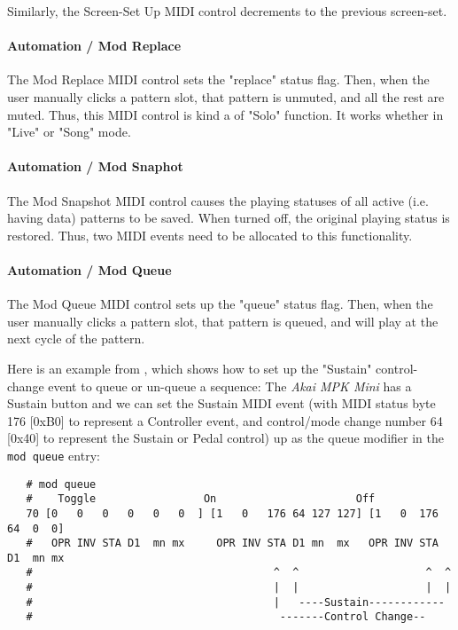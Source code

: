    Similarly, the Screen-Set Up MIDI control decrements to the previous
   screen-set.

\paragraph{Automation / Mod Replace}
\label{paragraph:configuration_midi_ctrl_modrep}

   The Mod Replace MIDI control sets the "replace" status flag.
   Then, when the user manually clicks a pattern slot,
   that pattern is unmuted, and all the rest are muted.
   Thus, this MIDI control is kind a of "Solo" function.
   It works whether in "Live" or "Song" mode.

\paragraph{Automation / Mod Snaphot}
\label{paragraph:configuration_midi_ctrl_modsnap}

   The Mod Snapshot MIDI control causes the playing statuses of all active
   (i.e. having data) patterns to be saved.  When turned off, the
   original playing status is restored.  Thus, two MIDI events
   need to be allocated to this functionality.

\paragraph{Automation / Mod Queue}
\label{paragraph:configuration_midi_ctrl_modqueue}

   The Mod Queue MIDI control sets up the "queue" status flag.
   Then, when the user manually clicks a pattern slot,
   that pattern is queued, and will play at the next cycle of the
   pattern.

   Here is an example from \cite{midicontrol}, which shows how to set up
   the "Sustain" control-change event to queue or un-queue a sequence:
   The \textsl{Akai MPK Mini} has a Sustain button and we can set the
   Sustain MIDI event (with MIDI status byte 176 [0xB0] to represent a
   Controller event, and control/mode change number 64 [0x40] to
   represent the Sustain or Pedal control) up as the queue modifier in
   the \texttt{mod queue} entry:

   \begin{verbatim}
   # mod queue
   #    Toggle                 On                      Off
   70 [0   0   0   0   0   0  ] [1   0   176 64 127 127] [1   0  176 64  0  0]
   #   OPR INV STA D1  mn mx     OPR INV STA D1 mn  mx   OPR INV STA D1  mn mx
   #                                      ^  ^                    ^  ^
   #                                      |  |                    |  |
   #                                      |   ----Sustain------------
   #                                       -------Control Change--
   \end{verbatim}


